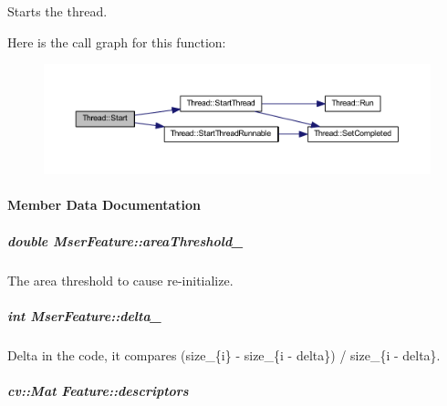 Starts the thread. 



Here is the call graph for this function\-:
\nopagebreak
\begin{figure}[H]
\begin{center}
\leavevmode
\includegraphics[width=350pt]{group___core_a2b42f82341afd2747ea093b6ac8b91cb_cgraph}
\end{center}
\end{figure}




\paragraph{Member Data Documentation}
\hypertarget{group___feature_extractor_ade4ed6ec57dbfefd1a263fa29419e54d}{
\subparagraph[{area\-Threshold\-\_\-}]{\setlength{\rightskip}{0pt plus 5cm}double Mser\-Feature\-::area\-Threshold\-\_\-\hspace{0.3cm}{\ttfamily [private]}}}\label{group___feature_extractor_ade4ed6ec57dbfefd1a263fa29419e54d}


The area threshold to cause re-\/initialize. 

\hypertarget{group___feature_extractor_a55dae2de52e614532d2243ca113fb3fb}{
\subparagraph[{delta\-\_\-}]{\setlength{\rightskip}{0pt plus 5cm}int Mser\-Feature\-::delta\-\_\-\hspace{0.3cm}{\ttfamily [private]}}}\label{group___feature_extractor_a55dae2de52e614532d2243ca113fb3fb}


Delta in the code, it compares (size\-\_\-\{i\} -\/ size\-\_\-\{i -\/ delta\}) / size\-\_\-\{i -\/ delta\}. 

\hypertarget{group___feature_extractor_a857c4955b0325d8b96c863d873bf8db5}{
\subparagraph[{descriptors}]{\setlength{\rightskip}{0pt plus 5cm}cv\-::\-Mat Feature\-::descriptors\hspace{0.3cm}{\ttfamily [inherited]}}}\label{group___feature_extractor_a857c4955b0325d8b96c863d873bf8db5}


